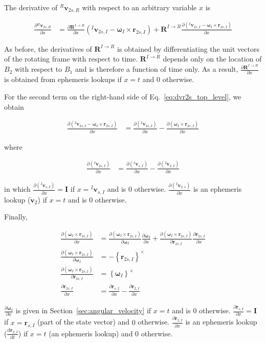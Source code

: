 \documentclass[]{article}
\newcommand{\vb}[1]{\bm{#1}} %
\newcommand{\ddt}[1]{\frac{\mathrm{d} #1}{\mathrm{d} t}} %
\newcommand{\pd}[2]{\frac{\partial #1}{\partial #2}} %
\newcommand{\crossmat}[1]{\left\{ {#1} \right\}^{\times}} %
\newcommand{\vbr}[0]{\vb{r}}
\newcommand{\vbv}[0]{\vb{v}}
\begin{document}
The derivative of ${}^R \vb{v}_{2s,R}$ with respect to an arbitrary variable $x$ is

\begin{align}
	\label{eq:dvr2s_top_level}
	\pd{{}^R \vb{v}_{2s,R}}{x} &= \pd{\vb{R}^{I \rightarrow R}}{x} \left( {}^I \vbv_{2s,I} - \vb{\omega}_I \times \vbr_{2s,I} \right) + \vb{R}^{I \rightarrow R} \pd{ \left( {}^I \vbv_{2s,I} - \vb{\omega}_I \times \vbr_{2s,I} \right)}{x}
\end{align}

\noindent As before, the derivatives of $\vb{R}^{I \rightarrow R}$ is obtained by differentiating the unit vectors of the rotating frame with respect to time. $\vb{R}^{I \rightarrow R}$ depends only on the location of $B_2$ with respect to $B_1$ and is therefore a function of time only. As a result, $\pd{\vb{R}^{I \rightarrow R}}{x}$ is obtained from ephemeris lookups if $x = t$ and 0 otherwise.

For the second term on the right-hand side of Eq.~\ref{eq:dvr2s_top_level}, we obtain

\begin{align}
	\pd{ \left( {}^I \vbv_{2s,I} - \vb{\omega}_I \times \vbr_{2s,I} \right)}{x} &= \pd{ \left( {}^I \vbv_{2s,I} \right)}{x} - \pd{ \left(\vb{\omega}_I \times \vbr_{2s,I} \right)}{x}
\end{align}

\noindent where

\begin{align}
\pd{\left({}^I \vbv_{2s,I} \right)}{x} &= \pd{\left({}^I \vbv_{s,I} \right)}{x} - \pd{\left({}^I \vbv_{2,I} \right)}{x} 
\end{align}

\noindent in which $\pd{\left({}^I \vbv_{s,I} \right)}{x} = \vb{I}$ if $x = {}^I \vbv_{s,I}$ and is $0$ otherwise. $ \pd{\left({}^I \vbv_{2,s} \right)}{x}$ is an ephemeris lookup ($\dot{\vbv}_2$) if $x = t$ and is $0$ otherwise.

Finally,

\begin{align}
	\pd{\left( \vb{\omega}_I \times \vbr_{2s,I} \right)}{x} &= \pd{\left( \vb{\omega}_I \times \vbr_{2s,I} \right)}{\vb{\omega}_I} \pd{\vb{\omega}_I}{x} + \pd{\left( \vb{\omega}_I \times \vbr_{2s,I} \right)}{\vbr_{2s,I}} \pd{\vbr_{2s,I}}{x} \\
	\pd{\left( \vb{\omega}_I \times \vbr_{2s,I} \right)}{\vb{\omega}_I} &= - \crossmat{\vbr_{2s,I}} \\
	\pd{\left( \vb{\omega}_I \times \vbr_{2s,I} \right)}{\vbr_{2s,I}} &= \crossmat{\vb{\omega}_I} \\
	\pd{\vbr_{2s,I}}{x} &= \pd{\vbr_{s,I}}{x} - \pd{\vbr_{2,I}}{x}
\end{align}

\noindent $\pd{\vb{\omega}_I}{x}$ is given in Section~\ref{sec:angular_velocity} if $x = t$ and is $0$ otherwise. $\pd{\vbr_{s,I}}{x} = \vb{I}$ if $x = \vb{r}_{s,I}$ (part of the state vector) and $0$ otherwise. $\pd{\vbr_{2,I}}{x}$ is an ephemeris lookup ($\ddt{\vbr_{2,I}}$) if $x = t$ (an ephemeris lookup) and $0$ otherwise.

%
%
\end{document}
